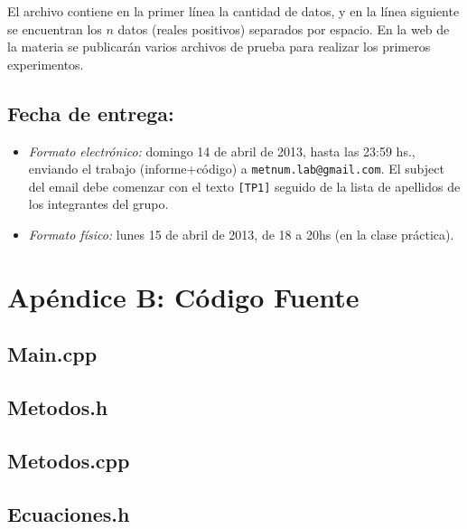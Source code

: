 \documentclass[a4paper,10pt,twoside]{article}
\begin{document}
\vspace{0.5cm}

El archivo contiene en la primer l\'inea la cantidad de datos, y en la l\'inea siguiente se encuentran los $n$ datos (reales positivos) separados por espacio. En la web de la materia se publicar\'an varios archivos de prueba para realizar los primeros experimentos.

\subsection{Fecha de entrega:} 

\begin{itemize}
\item \textsl{Formato electr\'onico:} domingo 14 de abril de 2013, hasta las 23:59 hs., enviando el trabajo (informe+c\'odigo) a \texttt{metnum.lab@gmail.com}. El subject del email debe comenzar con el texto \verb|[TP1]| seguido de la lista de apellidos de los integrantes del grupo. 
\item \textsl{Formato f\'isico:} lunes 15 de abril de 2013, de 18 a 20hs (en la clase pr\'actica).
\end{itemize}




\section{Apéndice B: Código Fuente}
\subsection{Main.cpp}

\subsection{Metodos.h}

\subsection{Metodos.cpp}

\subsection{Ecuaciones.h}

\end{document}
